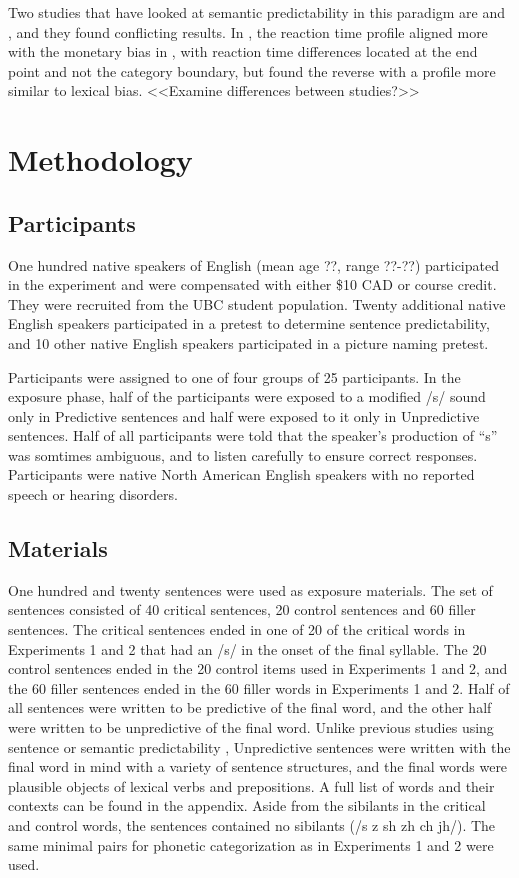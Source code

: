 Two studies that have looked at semantic predictability in this paradigm are \citet{Connine1987} and \citet{Borsky1998}, and they found conflicting results.  In \citet{Connine1987}, the reaction time profile aligned more with the monetary bias in \citet{Connine1987a}, with reaction time differences located at the end point and not the category boundary, but \citet{Borsky1998} found the reverse with a profile more similar to lexical bias.  <<Examine differences between studies?>>


\section{Methodology}

\subsection{Participants}

One hundred native speakers of English (mean age ??, range ??-??) participated in the experiment and were compensated with either \$10 CAD or course credit. They were recruited from the UBC student population.  Twenty additional native English speakers participated in a pretest to determine sentence predictability, and 10 other native English speakers participated in a picture naming pretest.

Participants were assigned to one of four groups of 25 participants.  In the exposure phase, half of the participants were exposed to a modified /s/ sound only in Predictive sentences and half were exposed to it only in Unpredictive sentences.  Half of all participants were told that the speaker's production of ``s'' was somtimes ambiguous, and to listen carefully to ensure correct responses.  Participants were native North American English speakers with no reported speech or hearing disorders.

\subsection{Materials}

One hundred and twenty sentences were used as exposure materials.  The set of sentences consisted of 40 critical sentences, 20 control sentences and 60 filler sentences.  The critical sentences ended in one of 20 of the critical words in Experiments 1 and 2 that had an /s/ in the onset of the final syllable.  The 20 control sentences ended in the 20 control items used in Experiments 1 and 2, and the 60 filler sentences ended in the 60 filler words in Experiments 1 and 2.  Half of all sentences were written to be predictive of the final word, and the other half were written to be unpredictive of the final word.  Unlike previous studies using sentence or semantic predictability \citep{Kalikow1977}, Unpredictive sentences were written with the final word in mind with a variety of sentence structures, and the final words were plausible objects of lexical verbs and prepositions.  A full list of words and their contexts can be found in the appendix. Aside from the sibilants in the critical and control words, the sentences contained no sibilants (/s z sh zh ch jh/).  The same minimal pairs for phonetic categorization as in Experiments 1 and 2 were used.

